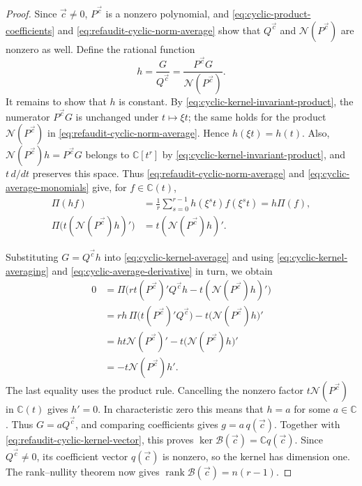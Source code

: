 \documentclass[12pt,reqno,a4paper]{amsart}
\numberwithin{equation}{section}
\numberwithin{figure}{section}
\theoremstyle{plain}
\theoremstyle{definition}
\begin{document}
\begin{proof}
Since $\vec c\ne0$, $P^{\vec c}$ is a nonzero polynomial, and
\eqref{eq:cyclic-product-coefficients} and
\eqref{eq:refaudit-cyclic-norm-average} show that $Q^{\vec c}$ and
$\mathscr N(P^{\vec c})$ are nonzero as well. Define the rational function
\[
 h=\frac{G}{Q^{\vec c}}
   =\frac{P^{\vec c}G}{\mathscr N(P^{\vec c})}.
\]
It remains to show that $h$ is constant.
By \eqref{eq:cyclic-kernel-invariant-product}, the numerator
$P^{\vec c}G$ is unchanged under $t\mapsto\xi t$; the same holds
for the product $\mathscr N(P^{\vec c})$ in
\eqref{eq:refaudit-cyclic-norm-average}. Hence $h(\xi t)=h(t)$.
Also, $\mathscr N(P^{\vec c})h=P^{\vec c}G$ belongs to
$\mathbb C[t^r]$ by \eqref{eq:cyclic-kernel-invariant-product}, and
$t\,d/dt$ preserves this space. Thus
\eqref{eq:refaudit-cyclic-norm-average} and
\eqref{eq:cyclic-average-monomials} give, for $f\in\mathbb C(t)$,
\begin{equation}\label{eq:cyclic-kernel-averaging}
 \begin{aligned}
 \Pi(hf)&=\frac1r\sum_{s=0}^{r-1}h(\xi^st)f(\xi^st)
          =h\Pi(f),\\
 \Pi\bigl(t(\mathscr N(P^{\vec c})h)'\bigr)
       &=t(\mathscr N(P^{\vec c})h)'.
 \end{aligned}
\end{equation}

Substituting $G=Q^{\vec c}h$ into \eqref{eq:cyclic-kernel-average}
and using \eqref{eq:cyclic-kernel-averaging} and
\eqref{eq:cyclic-average-derivative} in turn, we obtain
\[
 \begin{aligned}
 0&=\Pi\bigl(rt(P^{\vec c})'Q^{\vec c}h
        -t(\mathscr N(P^{\vec c})h)'\bigr)\\
  &=rh\,\Pi\bigl(t(P^{\vec c})'Q^{\vec c}\bigr)
        -t\bigl(\mathscr N(P^{\vec c})h\bigr)'\\
  &=ht\mathscr N(P^{\vec c})'
        -t\bigl(\mathscr N(P^{\vec c})h\bigr)'\\
  &=-t\mathscr N(P^{\vec c})h'.
 \end{aligned}
\]
The last equality uses the product rule. Cancelling the nonzero
factor $t\mathscr N(P^{\vec c})$ in
$\mathbb C(t)$ gives $h'=0$.  In characteristic zero this means
that $h=a$ for some $a\in\mathbb C$. Thus $G=aQ^{\vec c}$, and
comparing coefficients gives $g=a\,q(\vec c)$.
Together with \eqref{eq:refaudit-cyclic-kernel-vector}, this proves
$\ker\mathcal B(\vec c)=\mathbb Cq(\vec c)$.
Since $Q^{\vec c}\ne0$, its coefficient vector $q(\vec c)$ is
nonzero, so the kernel has dimension one. The rank--nullity theorem
now gives $\operatorname{rank}\mathcal B(\vec c)=n(r-1)$.
\end{proof}
\end{document}
